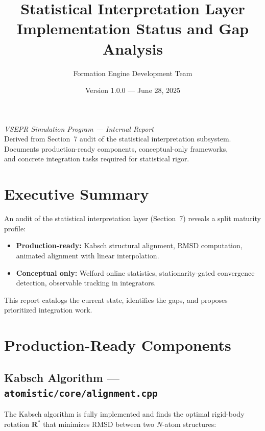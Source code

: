 ﻿\documentclass[11pt]{article}
\title{\textbf{Statistical Interpretation Layer} \\
\Large Implementation Status and Gap Analysis}
\author{Formation Engine Development Team}
\date{Version 1.0.0 --- June 28, 2025}
\begin{document}
\maketitle
\thispagestyle{empty}

\vfill
\begin{center}
\large\textit{VSEPR Simulation Program --- Internal Report} \\[0.5em]
\normalsize Derived from Section~7 audit of the statistical interpretation subsystem. \\
Documents production-ready components, conceptual-only frameworks, \\
and concrete integration tasks required for statistical rigor.
\end{center}
\vfill

\newpage
\tableofcontents
\newpage

\section{Executive Summary}

An audit of the statistical interpretation layer (Section~7) reveals a split
maturity profile:

\begin{itemize}
\item \textbf{Production-ready:} Kabsch structural alignment, RMSD computation,
	  animated alignment with linear interpolation.
\item \textbf{Conceptual only:} Welford online statistics, stationarity-gated
	  convergence detection, observable tracking in integrators.
\end{itemize}

This report catalogs the current state, identifies the gaps, and proposes
prioritized integration work.

\section{Production-Ready Components}

\subsection{Kabsch Algorithm --- \texttt{atomistic/core/alignment.cpp}}

The Kabsch algorithm is fully implemented and finds the optimal rigid-body
rotation $\mathbf{R}^*$ that minimizes RMSD between two $N$-atom structures:
\end{document}
